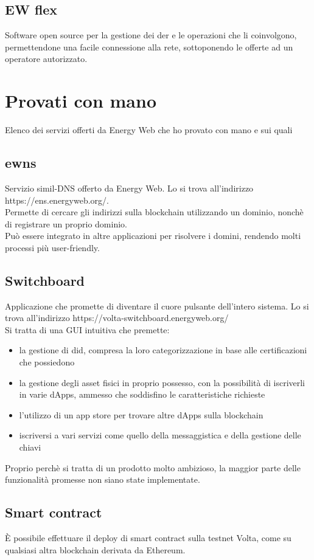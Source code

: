 \documentclass[12pt, letterpaper, twoside]{article}
\begin{document}
\subsection{EW flex}
Software open source per la gestione dei \gls{der} e le operazioni che li coinvolgono, permettendone una facile connessione alla rete, sottoponendo le offerte ad un operatore autorizzato.

\newpage

\section{Provati con mano}
Elenco dei servizi offerti da Energy Web che ho provato con mano e sui quali 

\subsection{\gls{ewns}}
Servizio simil-DNS offerto da Energy Web. Lo si trova all'indirizzo https://ens.energyweb.org/.\\
Permette di cercare gli indirizzi sulla blockchain utilizzando un dominio, nonchè di registrare un proprio dominio.\\
Può essere integrato in altre applicazioni per risolvere i domini, rendendo molti processi più user-friendly.

\subsection{Switchboard}
Applicazione che promette di diventare il cuore pulsante dell'intero sistema. Lo si trova all'indirizzo https://volta-switchboard.energyweb.org/ \\
Si tratta di una GUI intuitiva che premette:
\begin{itemize}
    \item la gestione di \gls{did}, compresa la loro categorizzazione in base alle certificazioni che possiedono
    \item la gestione degli asset fisici in proprio possesso, con la possibilità di iscriverli in varie dApps, ammesso che soddisfino le caratteristiche richieste
    \item l'utilizzo di un app store per trovare altre dApps sulla blockchain
    \item iscriversi a vari servizi come quello della messaggistica e della gestione delle chiavi
\end{itemize}
Proprio perchè si tratta di un prodotto molto ambizioso, la maggior parte delle funzionalità promesse non siano state implementate.

\subsection{Smart contract}
È possibile effettuare il deploy di smart contract sulla testnet Volta, come su qualsiasi altra blockchain derivata da Ethereum.

\newpage

\printbibliography
\end{document}
